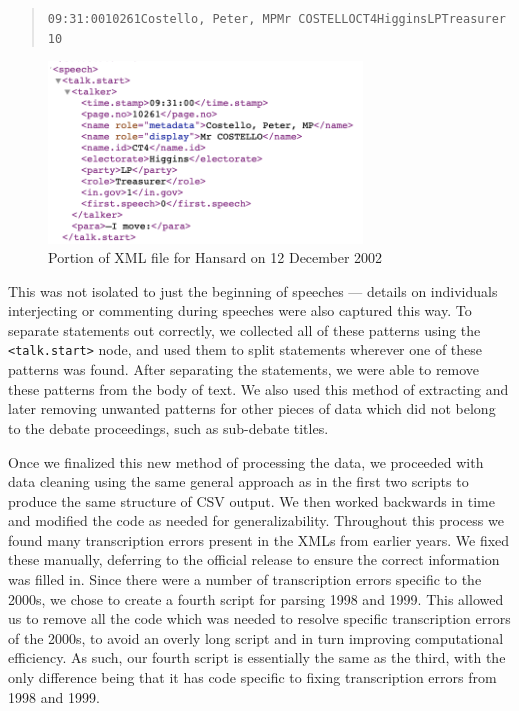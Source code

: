 \documentclass[
  letterpaper,
  DIV=11,
  numbers=noendperiod]{scrartcl}
\begin{document}
\begin{quote}
\texttt{09:31:0010261Costello,\ Peter,\ MPMr\ COSTELLOCT4HigginsLPTreasurer10}
\end{quote}

\begin{figure}

{\centering \includegraphics[width=3.28125in,height=\textheight]{images/patternEX.png}

}

\caption{\label{fig-patternEX}Portion of XML file for Hansard on 12
December 2002}

\end{figure}

This was not isolated to just the beginning of speeches --- details on
individuals interjecting or commenting during speeches were also
captured this way. To separate statements out correctly, we collected
all of these patterns using the
\texttt{\textless{}talk.start\textgreater{}} node, and used them to
split statements wherever one of these patterns was found. After
separating the statements, we were able to remove these patterns from
the body of text. We also used this method of extracting and later
removing unwanted patterns for other pieces of data which did not belong
to the debate proceedings, such as sub-debate titles.

Once we finalized this new method of processing the data, we proceeded
with data cleaning using the same general approach as in the first two
scripts to produce the same structure of CSV output. We then worked
backwards in time and modified the code as needed for generalizability.
Throughout this process we found many transcription errors present in
the XMLs from earlier years. We fixed these manually, deferring to the
official release to ensure the correct information was filled in. Since
there were a number of transcription errors specific to the 2000s, we
chose to create a fourth script for parsing 1998 and 1999. This allowed
us to remove all the code which was needed to resolve specific
transcription errors of the 2000s, to avoid an overly long script and in
turn improving computational efficiency. As such, our fourth script is
essentially the same as the third, with the only difference being that
it has code specific to fixing transcription errors from 1998 and 1999.
\end{document}
